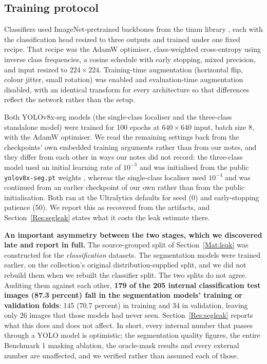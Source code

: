 \documentclass{melba}
\begin{document}
\subsection{Training protocol}
\label{Mat:train}
Classifiers used ImageNet-pretrained backbones \citep{imagenet} from the timm library \citep{timm}, each with the classification head resized to three outputs and trained under one fixed recipe. That recipe was the AdamW optimiser, class-weighted cross-entropy using inverse class frequencies, a cosine schedule with early stopping, mixed precision, and input resized to $224\times224$. Training-time augmentation (horizontal flip, colour jitter, small rotation) was enabled and evaluation-time augmentation disabled, with an identical transform for every architecture so that differences reflect the network rather than the setup.

Both YOLOv8x-seg models (the single-class localiser and the three-class standalone model) were trained for 100 epochs at $640\times640$ input, batch size 8, with the AdamW optimiser. We read the remaining settings back from the checkpoints' own embedded training arguments rather than from our notes, and they differ from each other in ways our notes did not record: the three-class model used an initial learning rate of $10^{-3}$ and was initialised from the public \texttt{yolov8x-seg.pt} weights \citep{ultralytics}, whereas the single-class localiser used $10^{-4}$ and was continued from an earlier checkpoint of our own rather than from the public initialisation. Both ran at the Ultralytics defaults for seed (0) and early-stopping patience (50). We report this as recovered from the artifacts, and Section~\ref{Res:segleak} states what it costs the leak estimate there.

\textbf{An important asymmetry between the two stages, which we discovered late and report in full.} The source-grouped split of Section~\ref{Mat:leak} was constructed for the \emph{classification} datasets. The segmentation models were trained earlier, on the collection's original distribution-supplied split, and we did not rebuild them when we rebuilt the classifier split. The two splits do not agree. Auditing them against each other, \textbf{179 of the 205 internal classification test images (87.3 percent) fall in the segmentation models' training or validation folds}: 145 (70.7 percent) in training and 34 in validation, leaving only 26 images that those models had never seen. Section~\ref{Res:segleak} reports what this does and does not affect. In short, every internal number that passes through a YOLO model is optimistic; the segmentation quality figures, the entire Benchmark 1 masking ablation, the oracle-mask results and every external number are unaffected, and we verified rather than assumed each of those.
\end{document}
